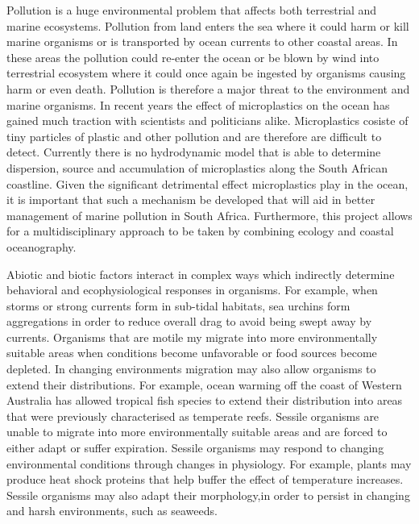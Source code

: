 \documentclass[]{article}
\begin{document}
Pollution is a huge environmental problem that affects both terrestrial
and marine ecosystems. Pollution from land enters the sea where it could
harm or kill marine organisms or is transported by ocean currents to
other coastal areas. In these areas the pollution could re-enter the
ocean or be blown by wind into terrestrial ecosystem where it could once
again be ingested by organisms causing harm or even death. Pollution is
therefore a major threat to the environment and marine organisms. In
recent years the effect of microplastics on the ocean has gained much
traction with scientists and politicians alike. Microplastics cosiste of
tiny particles of plastic and other pollution and are therefore are
difficult to detect. Currently there is no hydrodynamic model that is
able to determine dispersion, source and accumulation of microplastics
along the South African coastline. Given the significant detrimental
effect microplastics play in the ocean, it is important that such a
mechanism be developed that will aid in better management of marine
pollution in South Africa. Furthermore, this project allows for a
multidisciplinary approach to be taken by combining ecology and coastal
oceanography.

Abiotic and biotic factors interact in complex ways which indirectly
determine behavioral and ecophysiological responses in organisms. For
example, when storms or strong currents form in sub-tidal habitats, sea
urchins form aggregations in order to reduce overall drag to avoid being
swept away by currents. Organisms that are motile my migrate into more
environmentally suitable areas when conditions become unfavorable or
food sources become depleted. In changing environments migration may
also allow organisms to extend their distributions. For example, ocean
warming off the coast of Western Australia has allowed tropical fish
species to extend their distribution into areas that were previously
characterised as temperate reefs. Sessile organisms are unable to
migrate into more environmentally suitable areas and are forced to
either adapt or suffer expiration. Sessile organisms may respond to
changing environmental conditions through changes in physiology. For
example, plants may produce heat shock proteins that help buffer the
effect of temperature increases. Sessile organisms may also adapt their
morphology,in order to persist in changing and harsh environments, such
as seaweeds.
\end{document}
